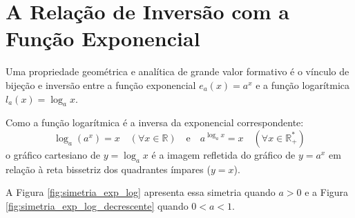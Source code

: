 \documentclass[12pt,a4paper]{report}
\begin{document}
	\section{A Relação de Inversão com a Função Exponencial}
	
	Uma propriedade geométrica e analítica de grande valor formativo é o vínculo de bijeção e inversão entre a função exponencial $e_a(x) = a^x$ e a função logarítmica $l_a(x) = \log_a x$.
	
	\begin{destaque}
		Como a função logarítmica é a inversa da exponencial correspondente:
		$$\log_a(a^x) = x \quad (\forall x \in \mathbb{R}) \quad \text{e} \quad a^{\log_a x} = x \quad (\forall x \in \mathbb{R}^*_+)$$
		o gráfico cartesiano de $y = \log_a x$ é a imagem refletida do gráfico de $y = a^x$ em relação à reta bissetriz dos quadrantes ímpares ($y = x$).
		
		A Figura \ref{fig:simetria_exp_log} apresenta essa simetria quando $a>0$ e a Figura  \ref{fig:simetria_exp_log_decrescente} quando $0<a<1$.
	\end{destaque}
		
\end{document}
